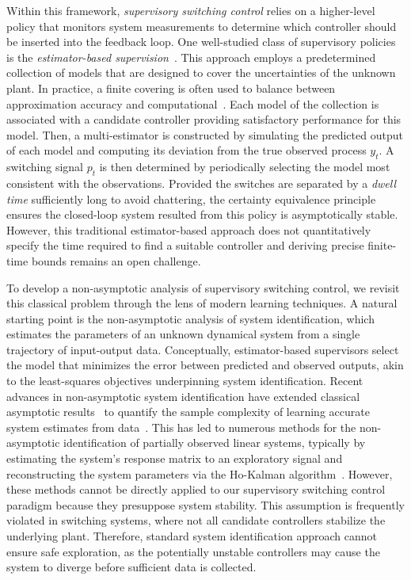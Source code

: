 \documentclass[11pt, twoside]{article}
\theoremstyle{definition}
\begin{document}
Within this framework, \textit{supervisory switching control} relies on a higher-level policy that monitors system measurements to determine which controller should be inserted into the feedback loop.
One well-studied class of supervisory policies is the \textit{estimator-based supervision}~\citep{morse1996supervisory,morse1997supervisory,hespanha2001tutorial}.
This approach employs a predetermined collection of models that are designed to cover the uncertainties of the unknown plant.
In practice, a finite covering is often used to balance between approximation accuracy and computational~\cite{morse1996supervisory,anderson2000multiple}.
Each model of the collection is associated with a candidate controller providing satisfactory performance for this model.
Then, a multi-estimator is constructed by simulating the predicted output of each model and computing its deviation from the true observed process $y_t$.
A switching signal $p_t$ is then determined by periodically selecting the model most consistent with the observations.
Provided the switches are separated by a \textit{dwell time} sufficiently long to avoid chattering, the certainty equivalence principle ensures the closed-loop system resulted from this policy is asymptotically stable.
However, this traditional estimator-based approach does not quantitatively specify the time required to find a suitable controller and deriving precise finite-time bounds remains an open challenge.

To develop a non-asymptotic analysis of supervisory switching control, we revisit this classical problem through the lens of modern learning techniques.
A natural starting point is the non-asymptotic analysis of system identification, which estimates the parameters of an unknown dynamical system from a single trajectory of input-output data.
Conceptually, estimator-based supervisors select the model that minimizes the error between predicted and observed outputs, akin to the least-squares objectives underpinning system identification.
Recent advances in non-asymptotic system identification have extended classical asymptotic results~\citep{ljung1998system} to quantify the sample complexity of learning accurate system estimates from data~\citep{simchowitz2018learning,ziemann2023tutorial,li2024learning}.
This has led to numerous methods for the non-asymptotic identification of partially observed linear systems, typically by estimating the system's response matrix to an exploratory signal and reconstructing the system parameters via the Ho-Kalman algorithm~\citep{oymak2019non,simchowitz2019learning,sarkar2021finite,bakshi2023new}.
However, these methods cannot be directly applied to our supervisory switching control paradigm because they presuppose system stability.
This assumption is frequently violated in switching systems, where not all candidate controllers stabilize the underlying plant.
Therefore, standard system identification approach cannot ensure safe exploration, as the potentially unstable controllers may cause the system to diverge before sufficient data is collected.
\end{document}
